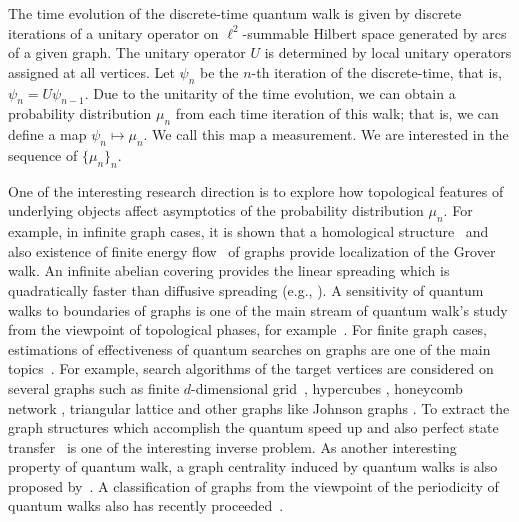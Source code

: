 \documentclass[a4paper,12pt]{article}
\numberwithin{equation}{section}
\begin{document}
The time evolution of the discrete-time quantum walk is given by discrete iterations of a unitary operator on $\ell^2$-summable Hilbert space generated by arcs of a given graph. 
The unitary operator $U$ is determined by local unitary operators assigned at all vertices. 
Let $\psi_n$ be the $n$-th iteration of the discrete-time, that is, $\psi_n=U\psi_{n-1}$. 
Due to the unitarity of the time evolution, we can obtain a probability distribution $\mu_n$ from each time iteration of this walk; 
that is, we can define a map $\psi_n\mapsto \mu_n$. 
We call this map a measurement. We are interested in the sequence of $\{\mu_n\}_n$. 


One of the interesting research direction is to explore how topological features of underlying objects affect asymptotics of the probability distribution $\mu_n$. 
For example, in infinite graph cases, it is shown that a homological structure~\cite{HKSS2} and also existence of finite energy flow~\cite{HS} of graphs provide localization of the Grover walk. 
An infinite abelian covering provides the linear spreading which is quadratically faster than diffusive spreading (e.g., \cite{HKSS2}). 
A sensitivity of quantum walks to boundaries of graphs is one of the main stream of quantum walk's study from the viewpoint of topological phases, for example~\cite{AE, CGSVWW, KRBD, OK}.  
For finite graph cases, estimations of effectiveness of quantum searches on graphs are one of the main topics~\cite{ADFP2012, ADMP2010, P2013, S2008, SKW2003}.
For example, 
search algorithms of the target vertices are considered on several graphs such as finite $d$-dimensional grid~\cite{AKR}, hypercubes \cite{SKW2003}, honeycomb network \cite{ADMP2010}, triangular lattice \cite{ADFP2012} and other graphs like Johnson graphs \cite{A2}.
To extract the graph structures which accomplish the quantum speed up and also perfect state transfer~\cite{SS} is one of the interesting inverse problem. 
As another interesting property of quantum walk, a graph centrality induced by quantum walks is also proposed by~\cite{Jingbo}. 
A classification of graphs from the viewpoint of the periodicity of quantum walks also has recently proceeded~\cite{HKSS1,Yoshie}. 
\end{document}
